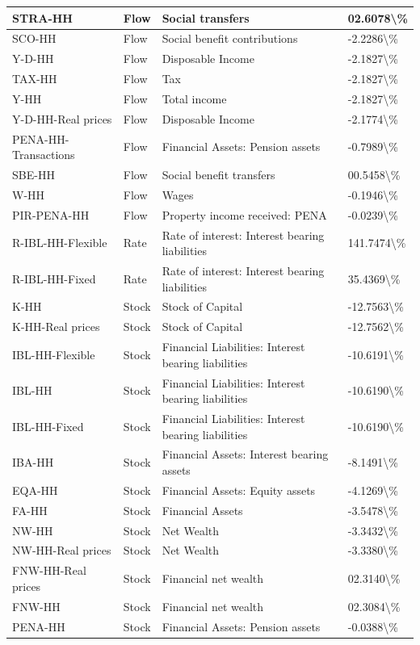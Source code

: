 \documentclass[
]{book}
\begin{document}
\begin{table}
\begin{tabular}[t]{l|l|l|l}
\hline
STRA-HH & Flow & Social transfers & 02.6078\textbackslash{}\%\\
\hline
SCO-HH & Flow & Social benefit contributions & -2.2286\textbackslash{}\%\\
\hline
Y-D-HH & Flow & Disposable Income & -2.1827\textbackslash{}\%\\
\hline
TAX-HH & Flow & Tax & -2.1827\textbackslash{}\%\\
\hline
Y-HH & Flow & Total income & -2.1827\textbackslash{}\%\\
\hline
Y-D-HH-Real prices & Flow & Disposable Income & -2.1774\textbackslash{}\%\\
\hline
PENA-HH-Transactions & Flow & Financial Assets: Pension assets & -0.7989\textbackslash{}\%\\
\hline
SBE-HH & Flow & Social benefit transfers & 00.5458\textbackslash{}\%\\
\hline
W-HH & Flow & Wages & -0.1946\textbackslash{}\%\\
\hline
PIR-PENA-HH & Flow & Property income received: PENA & -0.0239\textbackslash{}\%\\
\hline
R-IBL-HH-Flexible & Rate & Rate of interest: Interest bearing liabilities & 141.7474\textbackslash{}\%\\
\hline
R-IBL-HH-Fixed & Rate & Rate of interest: Interest bearing liabilities & 35.4369\textbackslash{}\%\\
\hline
K-HH & Stock & Stock of Capital & -12.7563\textbackslash{}\%\\
\hline
K-HH-Real prices & Stock & Stock of Capital & -12.7562\textbackslash{}\%\\
\hline
IBL-HH-Flexible & Stock & Financial Liabilities: Interest bearing liabilities & -10.6191\textbackslash{}\%\\
\hline
IBL-HH & Stock & Financial Liabilities: Interest bearing liabilities & -10.6190\textbackslash{}\%\\
\hline
IBL-HH-Fixed & Stock & Financial Liabilities: Interest bearing liabilities & -10.6190\textbackslash{}\%\\
\hline
IBA-HH & Stock & Financial Assets: Interest bearing assets & -8.1491\textbackslash{}\%\\
\hline
EQA-HH & Stock & Financial Assets: Equity assets & -4.1269\textbackslash{}\%\\
\hline
FA-HH & Stock & Financial Assets & -3.5478\textbackslash{}\%\\
\hline
NW-HH & Stock & Net Wealth & -3.3432\textbackslash{}\%\\
\hline
NW-HH-Real prices & Stock & Net Wealth & -3.3380\textbackslash{}\%\\
\hline
FNW-HH-Real prices & Stock & Financial net wealth & 02.3140\textbackslash{}\%\\
\hline
FNW-HH & Stock & Financial net wealth & 02.3084\textbackslash{}\%\\
\hline
PENA-HH & Stock & Financial Assets: Pension assets & -0.0388\textbackslash{}\%\\
\hline
\end{tabular}
\end{table}
\end{document}
